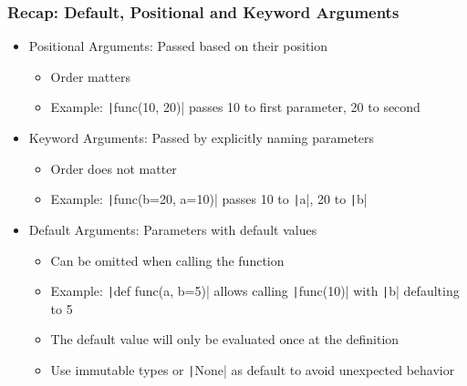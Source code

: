 \documentclass{beamer}
\newcommand{\python}[1]{\texttt|#1|}
\begin{document}
\begin{frame}
    \frametitle{Recap: Default, Positional and Keyword Arguments}
    \begin{itemize}
        \item Positional Arguments: Passed based on their position
              \begin{itemize}
                  \item Order matters
                  \item Example: \python{func(10, 20)} passes 10 to first parameter, 20 to second
              \end{itemize}
        \item Keyword Arguments: Passed by explicitly naming parameters
              \begin{itemize}
                  \item Order does not matter
                  \item Example: \python{func(b=20, a=10)} passes 10 to \python{a}, 20 to \python{b}
              \end{itemize}
        \item Default Arguments: Parameters with default values
              \begin{itemize}
                  \item Can be omitted when calling the function
                  \item Example: \python{def func(a, b=5)} allows calling \python{func(10)} with \python{b} defaulting to 5
                  \item The default value will only be evaluated once at the definition
                  \item Use immutable types or \python{None} as default to avoid unexpected behavior
              \end{itemize}
    \end{itemize}
\end{frame}
\end{document}
